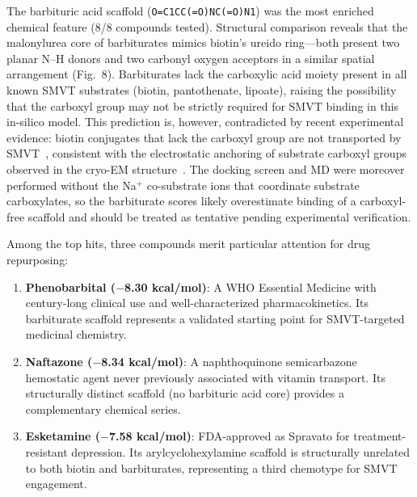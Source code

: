 \documentclass[10pt,letterpaper]{article}
\begin{document}
The barbituric acid scaffold (\texttt{O=C1CC(=O)NC(=O)N1}) was the most enriched chemical feature (8/8 compounds tested). Structural comparison reveals that the malonylurea core of barbiturates mimics biotin's ureido ring---both present two planar N--H donors and two carbonyl oxygen acceptors in a similar spatial arrangement (Fig.~8). Barbiturates lack the carboxylic acid moiety present in all known SMVT substrates (biotin, pantothenate, lipoate), raising the possibility that the carboxyl group may not be strictly required for SMVT binding in this in-silico model. This prediction is, however, contradicted by recent experimental evidence: biotin conjugates that lack the carboxyl group are not transported by SMVT~\cite{tripathi2025}, consistent with the electrostatic anchoring of substrate carboxyl groups observed in the cryo-EM structure~\cite{zhen2026}. The docking screen and MD were moreover performed without the \mbox{Na$^+$} co-substrate ions that coordinate substrate carboxylates, so the barbiturate scores likely overestimate binding of a carboxyl-free scaffold and should be treated as tentative pending experimental verification.

Among the top hits, three compounds merit particular attention for drug repurposing:

\begin{enumerate}
    \item \textbf{Phenobarbital ($-$8.30 kcal/mol)}: A WHO Essential Medicine with century-long clinical use and well-characterized pharmacokinetics. Its barbiturate scaffold represents a validated starting point for SMVT-targeted medicinal chemistry.
    \item \textbf{Naftazone ($-$8.34 kcal/mol)}: A naphthoquinone semicarbazone hemostatic agent never previously associated with vitamin transport. Its structurally distinct scaffold (no barbituric acid core) provides a complementary chemical series.
    \item \textbf{Esketamine ($-$7.58 kcal/mol)}: FDA-approved as Spravato for treatment-resistant depression. Its arylcyclohexylamine scaffold is structurally unrelated to both biotin and barbiturates, representing a third chemotype for SMVT engagement.
\end{enumerate}
\end{document}
